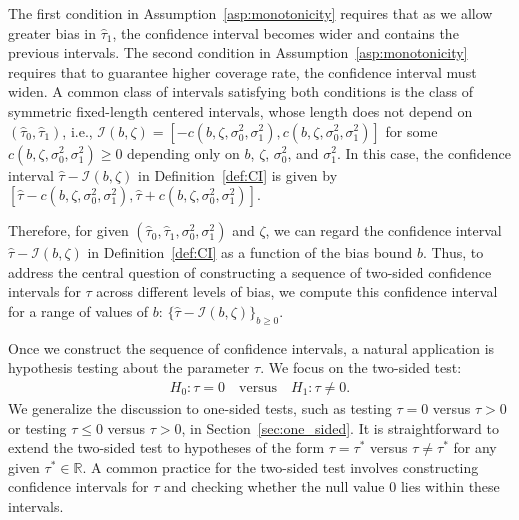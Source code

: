 \documentclass[11pt]{article}
\def\cI{{\mathcal I}}
\newcommand{\htau}{\widehat\tau}
\numberwithin{equation}{section}
\theoremstyle{definition}
\newcommand{\nb}[1]{{\color{red}{#1}}}
\begin{document}
The first condition in Assumption~\ref{asp:monotonicity} requires that as we allow greater bias in $\htau_1$, the confidence interval becomes wider and contains the previous intervals. The second condition in Assumption~\ref{asp:monotonicity} requires that to guarantee higher coverage rate, the confidence interval must widen. A common class of intervals satisfying both conditions is the class of symmetric fixed-length centered intervals, whose length does not depend on $(\htau_0, \htau_1)$, i.e., $\cI(b,\zeta) = [-c(b,\zeta, \sigma_0^2, \sigma_1^2), c(b,\zeta, \sigma_0^2, \sigma_1^2)]$ for some $c(b,\zeta, \sigma_0^2, \sigma_1^2) \ge 0$ depending only on $b$, $\zeta$, $\sigma_0^2$, and $\sigma_1^2$. In this case, the confidence interval $\hat\tau - \cI(b, \zeta)$ in Definition~\ref{def:CI} is given by $[\hat\tau - c(b,\zeta, \sigma_0^2, \sigma_1^2), \hat\tau + c(b,\zeta, \sigma_0^2, \sigma_1^2)]$. 

Therefore, for given $(\htau_0, \htau_1, \sigma_0^2, \sigma_1^2)$ and $\zeta$, we can regard the confidence interval $\hat\tau - \cI(b, \zeta)$ in Definition~\ref{def:CI} as a function of the bias bound $b$. Thus, to address the central question of constructing a sequence of two-sided confidence intervals for $\tau$ across different levels of bias, we compute this confidence interval for a range of values of $b$: $\{\hat\tau - \cI(b, \zeta)\}_{b \ge 0}$.


Once we construct the sequence of confidence intervals, a natural application is hypothesis testing about the parameter $\tau$. We focus on the two-sided test:
\begin{align}\label{eq:two_sided_test}
  H_0: \tau = 0 \quad\text{versus}\quad H_1: \tau \neq 0.
\end{align}
We generalize the discussion to one-sided tests, such as testing $\tau = 0$ versus $\tau > 0$ or testing $\tau \le 0$ versus $\tau > 0$, in Section~\ref{sec:one_sided}. It is straightforward to extend the two-sided test to hypotheses of the form $\tau = \tau^*$ versus $\tau \neq \tau^*$ for any given $\tau^* \in \mathbb{R}$. A common practice for the two-sided test involves constructing confidence intervals for $\tau$ and checking whether the null value $0$ lies within these intervals.
\end{document}
